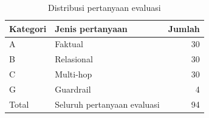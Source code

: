\begin{table}[htbp]
    \centering
    \small
    \caption{Distribusi pertanyaan evaluasi}
    \label{tab:bab4-eval-dataset}
    \begin{tabular}{llr}
        \toprule
        Kategori & Jenis pertanyaan & Jumlah \\
        \midrule
        A & Faktual & 30 \\
        B & Relasional & 30 \\
        C & Multi-hop & 30 \\
        G & Guardrail & 4 \\
        Total & Seluruh pertanyaan evaluasi & 94 \\
        \bottomrule
    \end{tabular}
\end{table}
